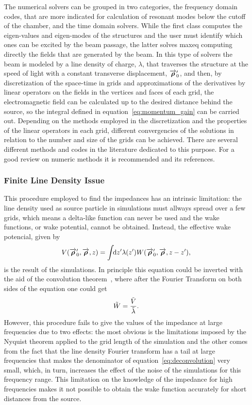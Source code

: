     The numerical solvers can be grouped in two categories, the frequency domain codes, that are more indicated for calculation of resonant modes below the cutoff of the chamber, and the time domain solvers. While the first class computes the eigen-values and eigen-modes of the structures and the user must identify which ones can be excited by the beam passage, the latter solves \gls{maxeq} computing directly the fields that are generated by the beam. In this type of solvers the beam is modeled by a line density of charge, $\lambda$, that traverses the structure at the speed of light with a constant transverse displacement, $\overrightarrow{\boldsymbol{\rho}}'_0$, and then, by discretization of the space-time in grids and approximations of the derivatives by linear operators on the fields in the vertices and faces of each grid, the electromagnetic field can be calculated up to the desired distance behind the source, so the integral defined in equation~\eqref{eq:momentum_gain} can be carried out. Depending on the methods employed in the discretization and the properties of the linear operators in each grid, different convergencies of the solutions in relation to the number and size of the grids can be achieved. There are several different methods and codes in the literature dedicated to this purpose. For a good review on numeric methods it is recommended  and its references.

\subsubsection{Finite Line Density Issue}

    This procedure employed to find the impedances has an intrinsic limitation: the line density used as source particle in simulations must allways spread over a few grids, which means a delta-like function can never be used and the wake functions, or wake potential, cannot be obtained. Instead, the effective wake potencial, given by
    \begin{align}
        V(\overrightarrow{\boldsymbol{\rho}}'_0, \overrightarrow{\boldsymbol{\rho}}, z) = \int\!\!\text{d}z' 
                \lambda(z') W(\overrightarrow{\boldsymbol{\rho}}'_0,\overrightarrow{\boldsymbol{\rho}},z-z'),
    \end{align}
    is the result of the simulations. In principle this equation could be inverted with the aid of the convolution theorem~\cite{wiki2017a}, where after the Fourier Transform on both sides of the equation one could get
    \begin{align}\label{eq:deconvolution}
        \tilde{W} = \frac{\tilde{V}}{\tilde{\lambda}}.
    \end{align}
    However, this procedure fails to give the values of the impedance at large frequencies due to two effects: the most obvious is the limitations imposed by the Nyquist theorem applied to the grid length of the simulation and the other comes from the fact that the line density Fourier transform has a tail at large frequencies that makes the denominator of equation~\eqref{eq:deconvolution} very small, which, in turn, increases the effect of the noise of the simulations for this frequency range. This limitation on the knowledge of the impedance for high frequencies makes it not possible to obtain the wake function accurately for short distances from the source.

